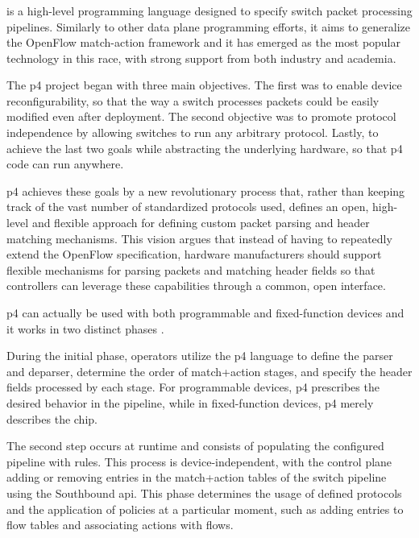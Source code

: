 \subsubsection[P4]{}
 is a high-level programming language designed to specify switch packet processing pipelines. Similarly to other data plane programming efforts, it aims to generalize the OpenFlow match-action framework and it has emerged as the most popular technology in this race, with strong support from both industry and academia\cite{hauser_survey_2021}.

The \gls{p4} project began with three main objectives\cite{bosshart_p4_2014}. The first was to enable device reconfigurability, so that the way a switch processes packets could be easily modified even after deployment. The second objective was to promote protocol independence by allowing switches to run any arbitrary protocol. Lastly, to achieve the last two goals while abstracting the underlying hardware, so that \gls{p4} code can run anywhere. 

\gls{p4} achieves these goals by a new revolutionary process that, rather than keeping track of the vast number of standardized protocols used, defines an open, high-level and flexible approach for defining custom packet parsing and header matching mechanisms. This vision argues that instead of having to repeatedly extend the OpenFlow specification, hardware manufacturers should support flexible mechanisms for parsing packets and matching header fields so that controllers can leverage these capabilities through a common, open interface. \cite{bosshart_p4_2014}

\gls{p4} can actually be used with both programmable and fixed-function devices\cite{peterson_software-defined_2021} and it works in two distinct phases \cite{bosshart_p4_2014}\cite{bifulco_survey_2018}. 

During the initial phase, operators utilize the \gls{p4} language to define the parser and deparser, determine the order of match+action stages, and specify the header fields processed by each stage. For programmable devices, \gls{p4} prescribes the desired behavior in the pipeline, while in fixed-function devices, \gls{p4} merely describes the chip. 

The second step occurs at runtime and consists of populating the configured pipeline with rules. This process is device-independent, with the control plane adding or removing entries in the match+action tables of the switch pipeline using the Southbound \gls{api}. This phase determines the usage of defined protocols and the application of policies at a particular moment, such as adding entries to flow tables and associating actions with flows.

